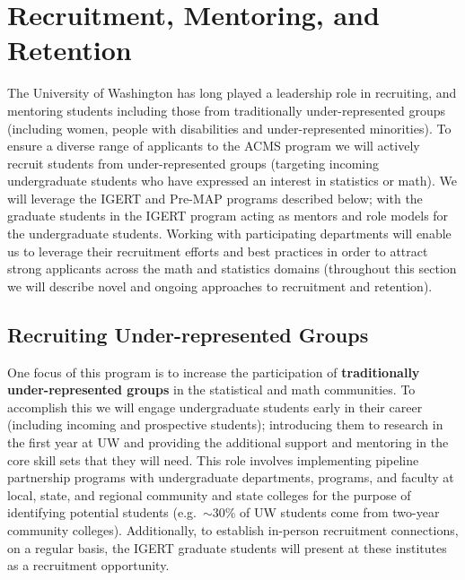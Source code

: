  \section{Recruitment, Mentoring, and Retention}

 The University of Washington has long played a leadership role in
 recruiting, and mentoring students including those from traditionally
 under-represented groups (including women, people with disabilities
 and under-represented minorities). To ensure a diverse range of
 applicants to the ACMS program we will actively recruit students from
 under-represented groups (targeting incoming undergraduate students
 who have expressed an interest in statistics or math).  We will
 leverage the IGERT and Pre-MAP programs described below; with the
 graduate students in the IGERT program acting as mentors and role
 models for the undergraduate students. Working with participating
 departments will enable us to leverage their recruitment efforts and
 best practices in order to attract strong applicants across the math
 and statistics domains (throughout this section we will describe
 novel and ongoing approaches to recruitment and retention).


\subsection{Recruiting Under-represented Groups}
 
One focus of this program is to increase the participation of
\textbf{traditionally under-represented groups} in the statistical and
math communities. To accomplish this we will engage undergraduate
students early in their career (including incoming and prospective
students); introducing them to research in the first year at UW and
providing the additional support and mentoring in the core skill sets
that they will need.  This role involves implementing pipeline
partnership programs with undergraduate departments, programs, and
faculty at local, state, and regional community and state colleges for
the purpose of identifying potential students (e.g.\ $\sim$30\% of UW
students come from two-year community colleges). Additionally, to
establish in-person recruitment connections, on a regular basis, the
IGERT graduate students will present at these institutes as a
recruitment opportunity.


